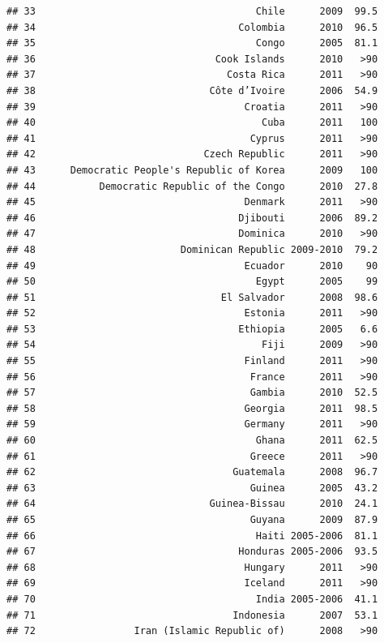 \documentclass[
]{book}
\begin{document}
\begin{verbatim}
## 33                                      Chile      2009  99.5
## 34                                   Colombia      2010  96.5
## 35                                      Congo      2005  81.1
## 36                               Cook Islands      2010   >90
## 37                                 Costa Rica      2011   >90
## 38                              Côte d’Ivoire      2006  54.9
## 39                                    Croatia      2011   >90
## 40                                       Cuba      2011   100
## 41                                     Cyprus      2011   >90
## 42                             Czech Republic      2011   >90
## 43      Democratic People's Republic of Korea      2009   100
## 44           Democratic Republic of the Congo      2010  27.8
## 45                                    Denmark      2011   >90
## 46                                   Djibouti      2006  89.2
## 47                                   Dominica      2010   >90
## 48                         Dominican Republic 2009-2010  79.2
## 49                                    Ecuador      2010    90
## 50                                      Egypt      2005    99
## 51                                El Salvador      2008  98.6
## 52                                    Estonia      2011   >90
## 53                                   Ethiopia      2005   6.6
## 54                                       Fiji      2009   >90
## 55                                    Finland      2011   >90
## 56                                     France      2011   >90
## 57                                     Gambia      2010  52.5
## 58                                    Georgia      2011  98.5
## 59                                    Germany      2011   >90
## 60                                      Ghana      2011  62.5
## 61                                     Greece      2011   >90
## 62                                  Guatemala      2008  96.7
## 63                                     Guinea      2005  43.2
## 64                              Guinea-Bissau      2010  24.1
## 65                                     Guyana      2009  87.9
## 66                                      Haiti 2005-2006  81.1
## 67                                   Honduras 2005-2006  93.5
## 68                                    Hungary      2011   >90
## 69                                    Iceland      2011   >90
## 70                                      India 2005-2006  41.1
## 71                                  Indonesia      2007  53.1
## 72                 Iran (Islamic Republic of)      2008   >90

\end{verbatim}
\end{document}
